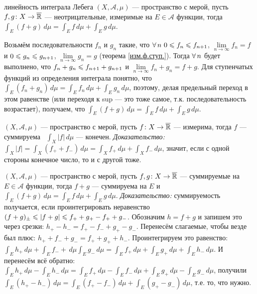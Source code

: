 \begin{teor}[https://www.youtube.com/live/fVyBKDoy3EM?si=aweqdxkzFWu_OKWd&t=11778]{линейность интеграла Лебега}\label{лин.инт.}
	 $(X, \mathcal A, \mu)$ --- пространство с мерой, пусть $f, g \colon X \to \overline{\mathbb R}$ --- неотрицательные, измеримые на $E \in \mathcal{A}$ функции, тогда $\int_E (f + g) \, d\mu = \int_E f \, d\mu + \int_E g \, d\mu$. 
\end{teor}

\begin{prf}
	Возьмём последовательности $f_n$ и $g_n$ такие, что $\forall \, n\ 0 \leqslant f_n \leqslant f_{n + 1}$, $\lim\limits_{n \to \infty} f_n = f$ и $0 \leqslant g_n \leqslant g_{n + 1}$, $\lim\limits_{n \to \infty} g_n = g$ (теорема \ref{изм.ф.ступ.}). Тогда $\forall \, n$ будет выполнено, что $f_n + g_n \leqslant f_{n + 1} + g_{n + 1}$ и $\lim\limits_{n \to \infty} f_n + g_n = f + g$. Для ступенчатых функций из определения интеграла понятно, что $\int_E (f_n + g_n) \, d\mu = \int_E f_n \, d\mu + \int_E g_n \, d\mu$, поэтому, делая предельный переход в этом равенстве (или переходя к sup --- это тоже самое, т.к. последовательность возрастает), получаем, что $\int_E (f + g) \, d\mu = \int_E f \, d\mu + \int_E g \, d\mu$.
\end{prf}

\begin{slv}\label{сумм.-инт.кон.}
	$(X, \mathcal A, \mu)$ --- пространство с мерой, пусть $f \colon X \to \overline{\mathbb R}$ --- измерима, тогда $f$ --- суммируема \eq\ $\int_X |f| \, d\mu$ --- конечен. \textit{Доказательство:} %
	$\int_X |f| = \int_X (f_+ + f_-) \, d\mu = \int_X f_+ \, d\mu + \int_X f_- \, d\mu$, значит, если с одной стороны конечное число, то и с другой тоже.
\end{slv}

\begin{slv}[https://www.youtube.com/live/fVyBKDoy3EM?si=4IK0f3bvhnMC-4It&t=12073]
	$(X, \mathcal A, \mu)$ --- пространство с мерой, пусть $f, g \colon X \to \overline{\mathbb R}$ --- суммируемые на $E \in \mathcal{A}$ функции, тогда $f + g$ --- суммируема на $E$ и $\int_E (f + g) \, d\mu = \int_E f \, d\mu + \int_E g \, d\mu$. \textit{Доказательство:} суммируемость получается, если проинтегрировать неравенство $(f + g)_\pm \leqslant |f + g| \leqslant f_+ + g_+ - f_ + + g_-$. Обозначим $h = f + g$ и запишем это через срезки: $h_+ - h_- = f_+ - f_- + g_+ - g_-$. Перенесём слагаемые, чтобы везде был плюс: $h_+ + f_- + g_- = f_+ + g_+ + h_-$. Проинтегрируем это равенство: $\int_E h_+ \, d\mu + \int_E f_- + \, d\mu \int_E g_- \, d\mu = \int_E f_+ \, d\mu + \int_E g_+ \, d\mu + \int_E h_- \, d\mu$. И перенесём всё обратно: $\int_E h_+ \, d\mu -\int_E h_- \, d\mu = \int_E f_+ \, d\mu - \int_E f_- \, d\mu + \int_E g_+ \, d\mu - \int_E g_- \, d\mu$, получили $\int_E (h_+ - h_-) \, d\mu = \int_E (f_+ - f_-) \, d\mu + \int_E (g_+ - g_-) \, d\mu$, т.е. то, что нужно.	
\end{slv}


